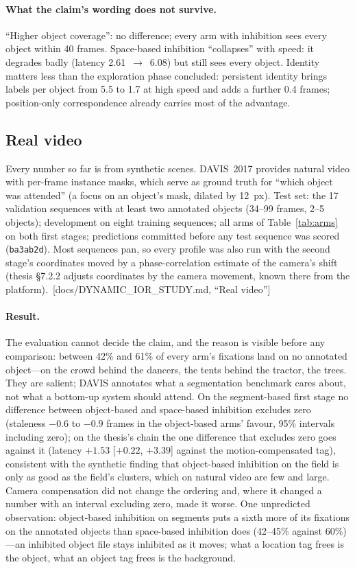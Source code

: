 \documentclass[11pt,a4paper]{article}
\newcommand{\src}[1]{\textcolor{blue!50!black}{\footnotesize\,[#1]}}
\newcommand{\src}[1]{}
\begin{document}
\paragraph{What the claim's wording does not survive.} ``Higher object
coverage'': no difference; every arm with inhibition sees every object within 40
frames. Space-based inhibition ``collapses'' with speed: it degrades badly
(latency 2.61~$\to$~6.08) but still sees every object. Identity matters less than
the exploration phase concluded: persistent identity brings labels per object
from 5.5 to 1.7 at high speed and adds a further 0.4 frames; position-only
correspondence already carries most of the advantage.

\subsection{Real video}
\label{sec:realvideo}
Every number so far is from synthetic scenes. DAVIS~2017 \citep{ponttuset2017}
provides natural video with per-frame instance masks, which serve as ground
truth for ``which object was attended'' (a focus on an object's mask, dilated
by 12~px). Test set: the 17 validation sequences with at least two annotated
objects (34--99 frames, 2--5 objects); development on eight training sequences;
all arms of Table~\ref{tab:arms} on both first stages; predictions committed
before any test sequence was scored (\texttt{ba3ab2d}). Most sequences pan, so
every profile was also run with the second stage's coordinates moved by a
phase-correlation estimate of the camera's shift (thesis \S7.2.2 adjusts
coordinates by the camera movement, known there from the platform).
\src{docs/DYNAMIC\_IOR\_STUDY.md, ``Real video''}

\paragraph{Result.} The evaluation cannot decide the claim, and the reason is
visible before any comparison: between 42\% and 61\% of every arm's fixations
land on no annotated object---on the crowd behind the dancers, the tents behind
the tractor, the trees. They are salient; DAVIS annotates what a segmentation
benchmark cares about, not what a bottom-up system should attend. On the
segment-based first stage no difference between object-based and space-based
inhibition excludes zero (staleness $-0.6$ to $-0.9$ frames in the object-based
arms' favour, 95\% intervals including zero); on the thesis's chain the one
difference that excludes zero goes against it (latency $+1.53$ [$+0.22$,
$+3.39$] against the motion-compensated tag), consistent with the synthetic
finding that object-based inhibition on the field is only as good as the
field's clusters, which on natural video are few and large. Camera compensation
did not change the ordering and, where it changed a number with an interval
excluding zero, made it worse. One unpredicted observation: object-based
inhibition on segments puts a sixth more of its fixations on the annotated
objects than space-based inhibition does (42--45\% against 60\%)---an inhibited
object file stays inhibited as it moves; what a location tag frees is the
object, what an object tag frees is the background.
\end{document}
